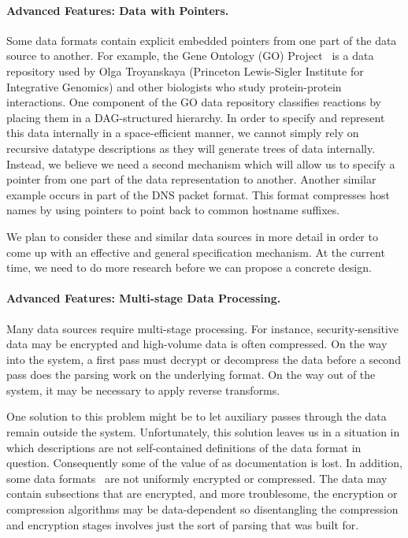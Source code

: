 \documentclass[11pt]{article}
\begin{document}
\paragraph*{Advanced Features:  Data with Pointers.}
Some data formats contain explicit embedded pointers 
from one part of the data source to another.
For example, the Gene Ontology (GO)
Project~\cite{geneontology} is a data repository used by Olga
Troyanskaya (Princeton Lewis-Sigler Institute for Integrative
Genomics) and other biologists who study protein-protein interactions.
One component of the GO data repository classifies reactions by
placing them in a DAG-structured hierarchy.  In order
to specify and represent this data internally in a 
space-efficient manner, we cannot simply rely on
recursive datatype descriptions as they will
generate trees of data internally.  Instead,
we believe we need a second mechanism which will allow us to specify
a pointer from one part of the data representation to another.
Another similar example occurs in
part of the DNS packet format.  This format compresses
host names by using pointers to point back to common
hostname suffixes. 

We plan to consider these and similar data sources in more detail
in order to come up with an effective and general specification mechanism.
At the current time, we need to do more research before we can
propose a concrete design.

\paragraph*{Advanced Features: Multi-stage Data Processing.}
Many data sources require multi-stage processing.  For instance,
security-sensitive data may be encrypted and high-volume data
is often compressed.  On the way into the system, a first 
pass must decrypt or decompress the data before a second pass
does the parsing work on the underlying format.  On the way out of the system, 
it may be necessary to apply reverse transforms.  

One solution
to this problem might be to let auxiliary passes through the data
remain outside the \datatype{} system.  Unfortunately, this solution
leaves us in a situation in which \datatype{} descriptions 
are not self-contained
definitions of the data format in question.  Consequently some of the value
of \datatype{} as documentation is lost.  
In addition, some data formats~\cite{korn+:delta,korn+:data-format} are not 
uniformly encrypted or compressed.
The data may contain subsections that are encrypted, and more troublesome,
the encryption or compression algorithms may be data-dependent so
disentangling the compression and encryption stages 
involves just the sort of parsing that \pads{} was built for.
\end{document}
